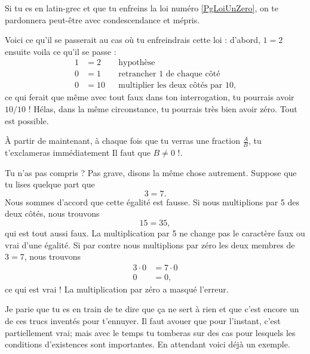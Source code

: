 \begin{loiphyz}
	Si tu es en latin-grec et que tu enfreins la loi numéro \ref{PgLoiUnZero}, on te pardonnera peut-être avec condescendance et mépris.
\end{loiphyz}

Voici ce qu'il se passerait au cas où tu enfreindrais cette loi : d'abord, $1=2$ ensuite voila ce qu'il se passe :
\begin{subequations}
\begin{align}
1&=2&&\text{hypothèse}\\
0&=1&&\text{retrancher $1$ de chaque côté}\\
0&=10&&\text{multiplier les deux côtés par 10},
\end{align}
\end{subequations}
ce qui ferait que même avec tout faux dans ton interrogation, tu pourrais avoir $10/10$ ! Hélas, dans la même circonstance, tu pourrais très bien avoir zéro. Tout est possible.

À partir de maintenant, à chaque fois que tu verras une fraction $\frac{ A }{ B }$, tu t'exclameras immédiatement \og Il faut que $B\neq 0$ !\fg.

Tu n'as pas compris ? Pas grave, disons la même chose autrement. Suppose que tu lises quelque part que
\[ 
  3=7.
\]
Nous sommes d'accord que cette égalité est fausse. Si nous multiplions par 5 des deux côtés, nous trouvons
\[ 
  15=35,
\]
qui est tout aussi faux. La multiplication par 5 ne change pas le caractère faux ou vrai d'une égalité. Si par contre nous multiplions par zéro les deux membres de $3=7$, nous trouvons
\begin{align*}
3\cdot 0&=7\cdot 0\\
  0&=0,
\end{align*}
ce qui est vrai ! La multiplication par zéro a masqué l'erreur.

Je parie que tu es en train de te dire que ça ne sert à rien et que c'est encore un de ces trucs inventés pour t'ennuyer. Il faut avouer que pour l'instant, c'est partiellement vrai; mais avec le temps tu tomberas sur des cas pour lesquels les conditions d'existences sont importantes. En attendant voici déjà un exemple.

